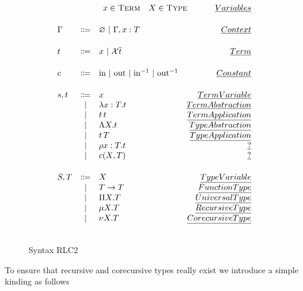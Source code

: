 \begin{figure}[H]
    \setlength{\abovedisplayskip}{0pt}
    \setlength{\belowdisplayskip}{0pt}
    \setlength{\abovedisplayshortskip}{0pt}
    \setlength{\belowdisplayshortskip}{0pt}
  \[
  \begin{array}{lclr}
    \multicolumn{4}{r}{
      x \in \textsc{Term}
      \quad
      X \in \textsc{Type}
      \mspace{60mu}
      \emph{Variables}
    }
    \\[0.5cm]

    \Gamma
    & \Coloneqq
    & \varnothing\ |\ \Gamma, x : T
    & \emph{Context}
    \\[0.5cm]

    t
    & \Coloneqq
    & x\ |\ \mathcal{X}\overline{t}
    & \emph{Term}
    \\[0.5cm]

    c
    & \Coloneqq
    & \text{in}\ |\ \text{out}\ |\ \text{in$^{-1}$}\ |\ \text{out$^{-1}$}
    & \emph{Constant}
    \\[0.5cm]

    s,t
    & \Coloneqq
    & x
    & \emph{Term Variable}
    \\
    & | & \lambda x : T.t
    & \emph{Term Abstraction}
    \\
    & | & t \, t
    & \emph{Term Application}
    \\
    & | & \Lambda X.t
    & \emph{Type Abstraction}
    \\
    & | & t \, T
    & \emph{Type Application}
    \\
    & | & \rho x : T.t
    & \emph{?}
    \\
    & | & c(X,T)
    & \emph{?}
    \\[0.5cm]

    S,T
    & \Coloneqq
    & X
    & \emph{Type Variable}
    \\
    & | & T \to T
    & \emph{Function Type}
    \\
    & | & \Pi X.T
    & \emph{Universal Type}
    \\
    & | & \mu X.T
    & \emph{Recursive Type}
    \\
    & | & \nu X.T
    & \emph{Corecursive Type}
    \\[0.5cm]
  \end{array}
  \]
  \caption{Syntax RLC2}
  \label{fig:RLC2:syntax}
\end{figure}

To ensure that recursive and corecursive types really exist we introduce a simple kinding as follows

